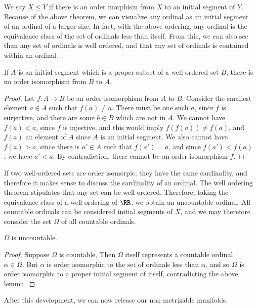 We say $X \leq Y$ if there is an order morphism from $X$ to an initial segment of $Y$. Because of the above theorem, we can visualize any ordinal as an initial segment of an ordinal of a larger size. In fact, with the above ordering, any ordinal is the equivalence class of the set of ordinals less than itself. From this, we can also see than any set of ordinals is well ordered, and that any set of ordinals is contained within an ordinal.

\begin{lemma}
    If $A$ is an initial segment which is a proper subset of a well ordered set $B$, there is no order isomorphism from $B$ to $A$.
\end{lemma}
\begin{proof}
    Let $f:A \to B$ be an order isomorphism from $A$ to $B$. Consider the smallest element $a \in A$ such that $f(a) \neq a$. There must be one such $a$, since $f$ is surjective, and there are some $b \in B$ which are not in $A$. We cannot have $f(a) < a$, since $f$ is injective, and this would imply $f(f(a)) \neq f(a)$, and $f(a)$ an element of $A$ since $A$ is an initial segment. We also cannot have $f(a) > a$, since there is $a' \in A$ such that $f(a') = a$, and since $f(a') < f(a)$, we have $a' < a$. By contradiction, there cannot be an order isomorphism $f$.
\end{proof}

If two well-ordered sets are order isomorpic, they have the same cardinality, and therefore it makes sense to discuss the cardinality of an ordinal. The well ordering theorem stipulates that any set can be well ordered. Therefore, taking the equivalence class of a well-ordering of $\RR$, we obtain an uncountable ordinal. All countable ordinals can be considered initial segments of $X$, and we may therefore consider the set $\Omega$ of all countable ordinals.

\begin{theorem}
    $\Omega$ is uncountable.
\end{theorem}
\begin{proof}
    Suppose $\Omega$ is countable, Then $\Omega$ itself represents a countable ordinal $\alpha \in \Omega$. But $\alpha$ is order isomorphic to the set of ordinals less than $\alpha$, and so $\Omega$ is order isomorphic to a proper initial segment of itself, contradicting the above lemma.
\end{proof}

After this development, we can now release our non-metrizable manifolds.

